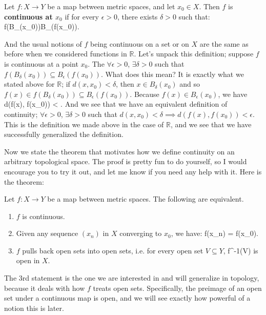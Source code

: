 	\begin{definition}[Continuity]
		Let $f : X\rightarrow Y$ be a map between metric spaces, and let $x_0\in X$. Then $f$ is \textbf{continuous at $x_0$} if for every $\epsilon > 0$, there 
		exists $\delta > 0$ such that:
		\eq
			f(B_\delta(x_0))\subseteq B_\epsilon(f(x_0)).
		\qe
	\end{definition}
	
	And the usual notions of $f$ being continuous on a set or on $X$ are the same as before when we considered functions in $\mathbb R$. Let's unpack this 
	definition; suppose $f$ is continuous at a point $x_0$. The $\forall\epsilon > 0$, $\exists\delta > 0$ such that $f(B_\delta(x_0))\subseteq B_\epsilon(f(x_0))$. 
	What does this mean? It is exactly what we stated above for $\mathbb R$; if $d(x, x_0) < \delta$, then $x\in B_\delta(x_0)$ and so $f(x)\in f(B_\delta(x_0))
	\subseteq B_\epsilon(f(x_0))$. Because $f(x)\in B_\epsilon(x_0)$, we have
	\eq
		d(f(x), f(x_0)) < \epsilon.
	\qe
	And we see that we have an equivalent definition of continuity; $\forall\epsilon > 0$, $\exists\delta > 0$ such that $d(x, x_0) < \delta\implies d(f(x), f(x_0)) < 
	\epsilon$. This is the definition we made above in the case of $\mathbb R$, and we see that we have successfully generalized the definition.
	
	Now we state the theorem that motivates how we define continuity on an arbitrary topological space. The proof is pretty fun to do yourself, so I would 
	encourage you to try it out, and let me know if you need any help with it. Here is the theorem:
	
	\begin{theorem}
		Let $f : X\rightarrow Y$ be a map between metric spaces. The following are equivalent.
		\begin{enumerate}
			\item $f$ is continuous.
			\item Given any sequence $(x_n)$ in $X$ converging to $x_0$, we have:
			\eq
				\lim f(x_n) = f(x_0).
			\qe
			\item $f$ pulls back open sets into open sets, i.e. for every open set $V\subseteq Y$, 
			\eq
				f^{-1}(V)
			\qe
			is open in $X$.
		\end{enumerate}
	\end{theorem}
	
	The 3rd statement is the one we are interested in and will generalize in topology, because it deals with how $f$ treats open sets. Specifically, the preimage 
	of an open set under a continuous map is open, and we will see exactly how powerful of a notion this is later.
	
